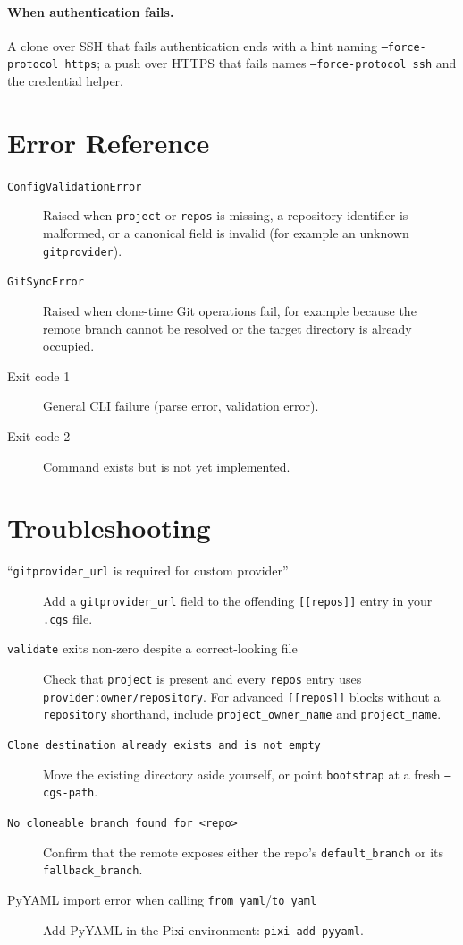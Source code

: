 \paragraph{When authentication fails.} A clone over SSH that fails
authentication ends with a hint naming \texttt{--force-protocol https}; a
push over HTTPS that fails names \texttt{--force-protocol ssh} and the
credential helper.

\section{Error Reference}

\begin{description}
  \item[\texttt{ConfigValidationError}] Raised when \texttt{project} or
    \texttt{repos} is missing, a repository identifier is malformed, or a
    canonical field is invalid (for example an unknown \texttt{gitprovider}).
  \item[\texttt{GitSyncError}] Raised when clone-time Git operations fail,
    for example because the remote branch cannot be resolved or the target
    directory is already occupied.
  \item[Exit code 1] General CLI failure (parse error, validation error).
  \item[Exit code 2] Command exists but is not yet implemented.
\end{description}

\section{Troubleshooting}

\begin{description}
  \item[``\texttt{gitprovider\_url} is required for custom provider'']
    Add a \texttt{gitprovider\_url} field to the offending
    \texttt{[[repos]]} entry in your \texttt{.cgs} file.
  \item[\texttt{validate} exits non-zero despite a correct-looking file]
    Check that \texttt{project} is present and every \texttt{repos} entry uses
    \texttt{provider:owner/repository}. For advanced \texttt{[[repos]]}
    blocks without a \texttt{repository} shorthand, include
    \texttt{project\_owner\_name} and \texttt{project\_name}.
  \item[\texttt{Clone destination already exists and is not empty}]
    Move the existing directory aside yourself, or point \texttt{bootstrap}
    at a fresh \texttt{--cgs-path}.
  \item[\texttt{No cloneable branch found for <repo>}]
    Confirm that the remote exposes either the repo's
    \texttt{default\_branch} or its \texttt{fallback\_branch}.
  \item[PyYAML import error when calling \texttt{from\_yaml}/\texttt{to\_yaml}]
    Add PyYAML in the Pixi environment: \texttt{pixi add pyyaml}.
\end{description}

